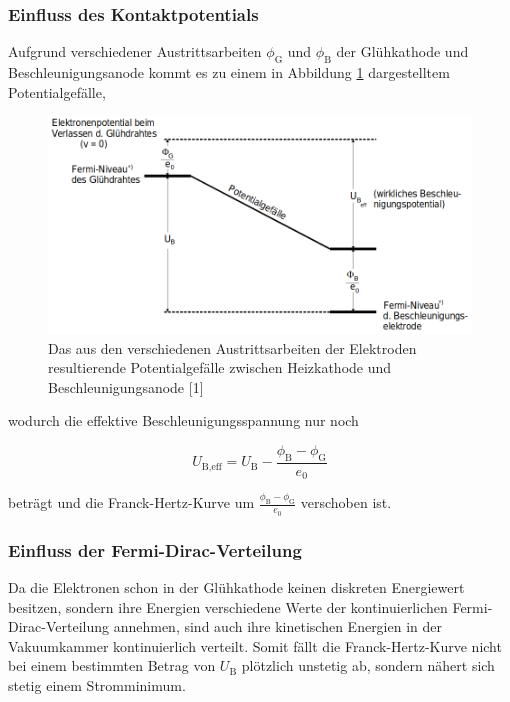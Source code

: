 \subsubsection{Einfluss des Kontaktpotentials}

Aufgrund verschiedener Austrittsarbeiten $\phi_\text{G}$ und $\phi_\text{B}$ der Glühkathode 
und Beschleunigungsanode kommt es zu einem in Abbildung \ref{fig:bild3} dargestelltem Potentialgefälle,

\begin{figure} [H]
    \centering
    \includegraphics[scale=0.4]{content/bild3.png}
    \caption{Das aus den verschiedenen Austrittsarbeiten der Elektroden resultierende Potentialgefälle zwischen Heizkathode
    und Beschleunigungsanode [1]}
    \label{fig:bild3}
  \end{figure}

wodurch die effektive Beschleunigungsspannung nur noch

\begin{equation}
    U_\text{B,eff} = U_\text{B} - \frac{\phi_\text{B} - \phi_\text{G}}{e_0}
\end{equation}

beträgt und die Franck-Hertz-Kurve um $\frac{\phi_\text{B} - \phi_\text{G}}{e_0}$ verschoben ist.

\subsubsection{Einfluss der Fermi-Dirac-Verteilung}

Da die Elektronen schon in der Glühkathode keinen diskreten Energiewert besitzen, sondern
ihre Energien verschiedene Werte der kontinuierlichen Fermi-Dirac-Verteilung annehmen,
sind auch ihre kinetischen Energien in der Vakuumkammer kontinuierlich verteilt.
Somit fällt die Franck-Hertz-Kurve nicht bei einem bestimmten Betrag von $U_\text{B}$ plötzlich
unstetig ab, sondern nähert sich stetig einem Stromminimum.

